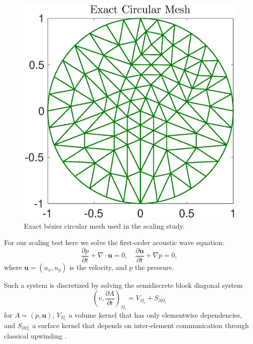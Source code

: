 \begin{figure}[h]
\begin{center}
\includegraphics[width=0.8\linewidth]{./bidg_data/168_circ}
\end{center}
\vspace*{-.5cm}
\caption{Exact b\'{e}zier circular mesh used in the scaling study.}
\label{fig:168_circ}
\end{figure}

For our scaling test here we solve the first-order acoustic wave equation:
\begin{equation}
  \label{awe}
  \frac{\partial p}{\partial t} + \nabla\cdot \boldsymbol{u} = 0, \quad
  \frac{\partial\boldsymbol{u}}{\partial t} + \nabla p = 0,
\end{equation}
where $\boldsymbol{u}=(u_x,u_y)$ is the velocity, and $p$ the pressure.

Such a system is discretized by solving the semidiscrete block diagonal system
\[
  \left( v, \frac{ \partial A}{\partial t} \right)_{\Omega_{i}} =
  V_{\Omega_{i}}+S_{\partial\Omega_{i}}
\]
for $A = (p,\boldsymbol{u})$, $V_{\Omega_{i}}$ a volume kernel that has only
elementwise dependencies, and $S_{\partial\Omega_{i}}$ a surface kernel that
depends on inter-element communication through classical upwinding
\cite{Michoski2014898}.

